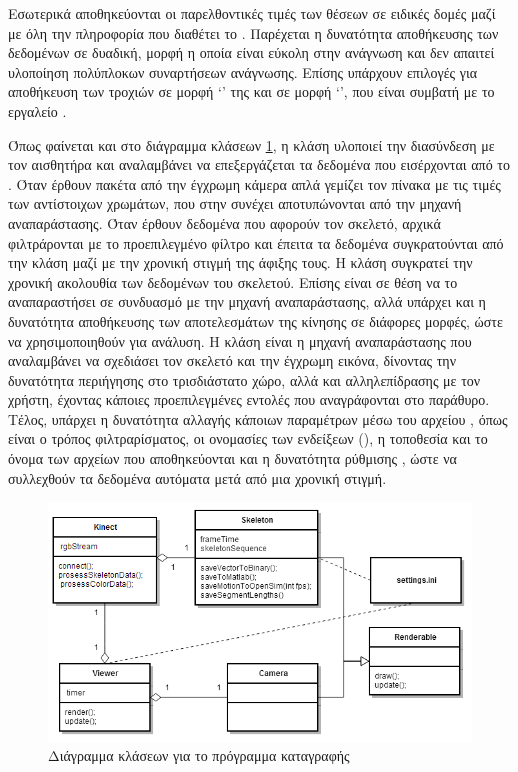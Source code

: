 Εσωτερικά αποθηκεύονται οι παρελθοντικές τιμές των θέσεων σε ειδικές δομές μαζί με όλη την πληροφορία που διαθέτει το . Παρέχεται η δυνατότητα αποθήκευσης των δεδομένων σε δυαδική, μορφή η οποία είναι εύκολη στην ανάγνωση και δεν απαιτεί υλοποίηση πολύπλοκων συναρτήσεων ανάγνωσης. Επίσης υπάρχουν επιλογές για αποθήκευση των τροχιών σε μορφή \lq {}\rq\; της  και σε μορφή \lq {}\rq  , που είναι συμβατή με το εργαλείο .

Όπως φαίνεται και στο διάγραμμα κλάσεων \ref{fig:motion-capture-class-diagram}, η κλάση  υλοποιεί την διασύνδεση με τον αισθητήρα και αναλαμβάνει να επεξεργάζεται τα δεδομένα που εισέρχονται από το . Όταν έρθουν πακέτα από την έγχρωμη κάμερα απλά γεμίζει τον πίνακα  με τις τιμές των αντίστοιχων χρωμάτων, που στην συνέχει αποτυπώνονται από την μηχανή αναπαράστασης. Όταν έρθουν δεδομένα που αφορούν τον σκελετό, αρχικά φιλτράρονται με το προεπιλεγμένο φίλτρο και έπειτα τα δεδομένα συγκρατούνται από την κλάση  μαζί με την χρονική στιγμή της άφιξης τους. Η κλάση  συγκρατεί την χρονική ακολουθία των δεδομένων του σκελετού. Επίσης είναι σε θέση να το αναπαραστήσει σε συνδυασμό με την μηχανή αναπαράστασης, αλλά υπάρχει και η δυνατότητα αποθήκευσης των αποτελεσμάτων της κίνησης σε διάφορες μορφές, ώστε να χρησιμοποιηθούν για ανάλυση. Η κλάση  είναι η μηχανή αναπαράστασης που αναλαμβάνει να σχεδιάσει τον σκελετό και την έγχρωμη εικόνα, δίνοντας την δυνατότητα περιήγησης στο τρισδιάστατο χώρο, αλλά και αλληλεπίδρασης με τον χρήστη, έχοντας κάποιες προεπιλεγμένες εντολές που αναγράφονται στο παράθυρο. Τέλος, υπάρχει η δυνατότητα αλλαγής κάποιων παραμέτρων μέσω του αρχείου , όπως είναι ο τρόπος φιλτραρίσματος, οι ονομασίες των ενδείξεων (), η τοποθεσία και το όνομα των αρχείων που αποθηκεύονται και η δυνατότητα ρύθμισης , ώστε να συλλεχθούν τα δεδομένα αυτόματα μετά από μια χρονική στιγμή.

\begin{figure}[H]
    \centering
    \includegraphics[width=.9\textwidth, keepaspectratio]{fig/motion-capture-class-diagram.png}
    \caption{Διάγραμμα κλάσεων για το πρόγραμμα καταγραφής}
    \label{fig:motion-capture-class-diagram}
\end{figure}

